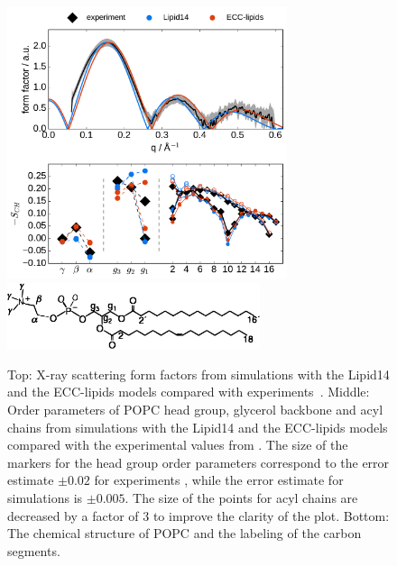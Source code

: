 \documentclass[aip,jcp,twocolumn]{revtex4}
\begin{document}
\begin{figure}[tb!]
  \centering
  \includegraphics[width=8.2cm]{../Fig/ipython_nb/Order-parameters_form-factors_exp-L14-ECCL17_q80_sig89.pdf}
  \includegraphics[width=7.4cm]{../Fig/POPCstructure.eps}
  \caption{\label{simVSexpNOions}
    Top: X-ray scattering form factors from simulations with the Lipid14 \cite{dickson14} and
    the ECC-lipids models compared with experiments~\cite{Kucerka2011}.
    Middle: Order parameters of POPC head group, glycerol backbone and acyl chains 
    from simulations with the Lipid14 \cite{dickson14} and the ECC-lipids models
    compared with the experimental values from \cite{ferreira13}.
    The size of the markers for the head group order parameters correspond to
    the error estimate $\pm 0.02$ for experiments \cite{botan15,ollila16},
    while the error estimate for simulations is $\pm 0.005$.
    The size of the points for acyl chains are decreased by a factor of 3 to improve the clarity of the plot.
    Bottom: The chemical structure of POPC and the labeling of the carbon segments.
  } 
\end{figure}
\end{document}

